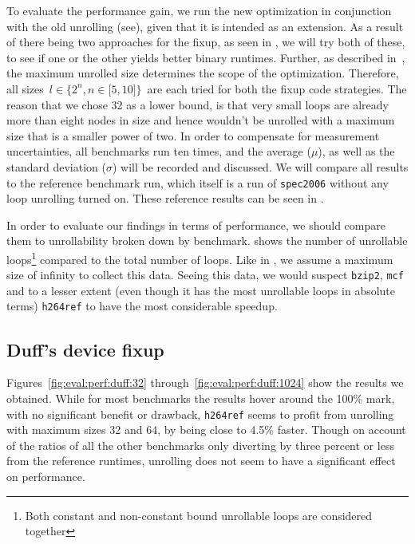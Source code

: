 To evaluate the performance gain, we run the new optimization in conjunction with the old unrolling (see), given that it is intended as an extension.
As a result of there being two approaches for the fixup, as seen in , we will try both of these, to see if one or the other yields better binary runtimes.
Further, as described in~, the maximum unrolled size determines  the scope of the optimization.
Therefore, all sizes~$l \in \{2^n, n \in \lbrack 5, 10 \rbrack \}$~are each tried for both the fixup code strategies.
The reason that we chose 32 as a lower bound, is that very small loops are already more than eight nodes in size and hence wouldn't be unrolled with a maximum size that is a smaller power of two.
In order to compensate for measurement uncertainties, all benchmarks run ten times, and the average ($\mu$), as well as the standard deviation ($\sigma$) will be recorded and discussed.
We will compare all results to the reference benchmark run, which itself is a run of \texttt{spec2006} without any loop unrolling turned on.
These reference results can be seen in .

In order to evaluate our findings in terms of performance, we should compare them to unrollability broken down by benchmark.
 shows the number of unrollable loops\footnote{Both constant and non-constant bound unrollable loops are considered together} compared to the total number of loops.
Like in , we assume a maximum size of infinity to collect this data.
Seeing this data, we would suspect \texttt{bzip2}, \texttt{mcf} and to a lesser extent (even though it has the most unrollable loops in absolute terms) \texttt{h264ref} to have the most considerable speedup.





\subsection{Duff's device fixup}\label{sec:eval:perf:duff}

Figures~\ref{fig:eval:perf:duff:32} through~\ref{fig:eval:perf:duff:1024} show the results we obtained.
While for most benchmarks the results hover around the 100\% mark, with no significant benefit or drawback, \texttt{h264ref} seems to profit from unrolling with maximum sizes 32 and 64, by being close to 4.5\% faster.
Though on account of the ratios of all the other benchmarks only diverting by three percent or less from the reference runtimes, unrolling does not seem to have a significant effect on performance.

